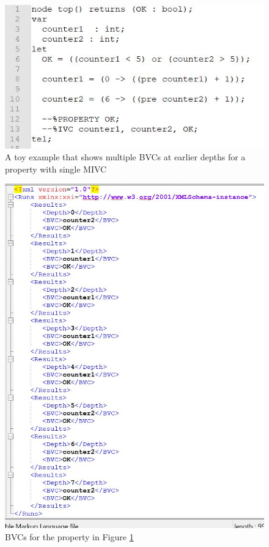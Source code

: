 \begin{figure}
 \centering
  \includegraphics[width=0.8\columnwidth]{figs/toybvc.jpg}
  \caption{A toy example that shows multiple BVCs at earlier depths for a property with single MIVC}
  \vspace{0.1in}
  \label{fig:toybvc}
\end{figure}

\begin{figure}
 \centering
  \includegraphics[width=\columnwidth]{figs/toyo1.jpg}
  \caption{BVCs for the property in Figure \ref{fig:toybvc}}
  \vspace{0.1in}
  \label{fig:toyo1}
\end{figure}



